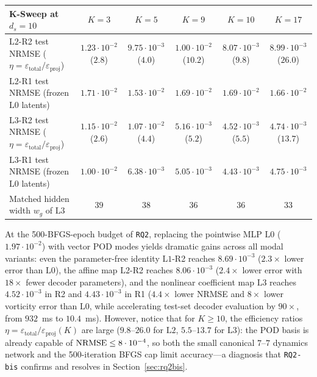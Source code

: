 \begin{table}[!htbp]
{\begin{tabular}{@{}lccccc@{}}
\toprule
\textbf{K-Sweep at $d_s = 10$} & $K = 3$ & $K = 5$ & $K = 9$ & $K = 10$ & $K = 17$ \\
\midrule
$\mathrm{L2}$-R2 test NRMSE ($\eta = \varepsilon_{\mathrm{total}}/\varepsilon_{\mathrm{proj}}$) & $1.23\cdot 10^{-2}$ ($2.8$) & $9.75\cdot 10^{-3}$ ($4.0$) & $1.00\cdot 10^{-2}$ ($10.2$) & $8.07\cdot 10^{-3}$ ($9.8$) & $8.99\cdot 10^{-3}$ ($26.0$) \\
$\mathrm{L2}$-R1 test NRMSE (frozen $\mathrm{L0}$ latents) & $1.71\cdot 10^{-2}$ & $1.53\cdot 10^{-2}$ & $1.69\cdot 10^{-2}$ & $1.69\cdot 10^{-2}$ & $1.66\cdot 10^{-2}$ \\
$\mathrm{L3}$-R2 test NRMSE ($\eta = \varepsilon_{\mathrm{total}}/\varepsilon_{\mathrm{proj}}$) & $1.15\cdot 10^{-2}$ ($2.6$) & $1.07\cdot 10^{-2}$ ($4.4$) & $5.16\cdot 10^{-3}$ ($5.2$) & $4.52\cdot 10^{-3}$ ($5.5$) & $4.74\cdot 10^{-3}$ ($13.7$) \\
$\mathrm{L3}$-R1 test NRMSE (frozen $\mathrm{L0}$ latents) & $1.00\cdot 10^{-2}$ & $6.38\cdot 10^{-3}$ & $5.05\cdot 10^{-3}$ & $4.43\cdot 10^{-3}$ & $4.75\cdot 10^{-3}$ \\
Matched hidden width $w_g$ of $\mathrm{L3}$ & $39$ & $38$ & $36$ & $36$ & $33$ \\
\bottomrule
\end{tabular}
}
\end{table}

At the 500-BFGS-epoch budget of \texttt{RQ2}, replacing the pointwise MLP $\mathrm{L0}$ ($1.97\cdot 10^{-2}$) with vector POD modes yields dramatic gains across all modal variants: even the parameter-free identity $\mathrm{L1}$-R2 reaches $8.69\cdot 10^{-3}$ ($2.3\times$ lower error than $\mathrm{L0}$), the affine map $\mathrm{L2}$-R2 reaches $8.06\cdot 10^{-3}$ ($2.4\times$ lower error with $18\times$ fewer decoder parameters), and the nonlinear coefficient map $\mathrm{L3}$ reaches $4.52\cdot 10^{-3}$ in R2 and $4.43\cdot 10^{-3}$ in R1 ($4.4\times$ lower NRMSE and $8\times$ lower vorticity error than $\mathrm{L0}$, while accelerating test-set decoder evaluation by $90\times$, from $932$~ms to $10.4$~ms). However, notice that for $K \ge 10$, the efficiency ratios $\eta = \varepsilon_{\mathrm{total}}/\varepsilon_{\mathrm{proj}}(K)$ are large ($9.8$--$26.0$ for $\mathrm{L2}$, $5.5$--$13.7$ for $\mathrm{L3}$): the POD basis is already capable of $\mathrm{NRMSE} \le 8\cdot 10^{-4}$, so both the small canonical $7\text{--}7$ dynamics network and the 500-iteration BFGS cap limit accuracy---a diagnosis that \texttt{RQ2-bis} confirms and resolves in Section~\ref{sec:rq2bis}.

